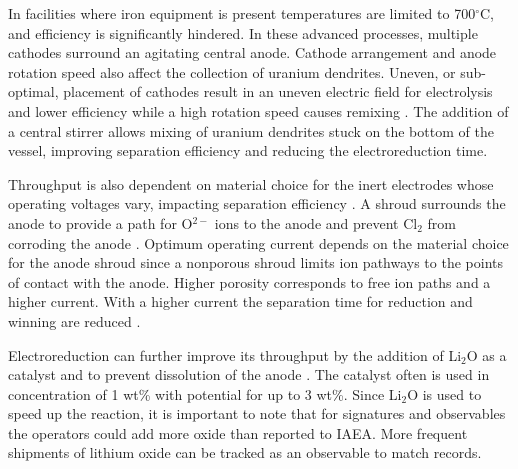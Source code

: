 \documentclass{anstrans}
\begin{document}
In facilities where iron equipment is present temperatures are limited to 700$^{\circ}$C, and efficiency is significantly 
hindered. In these advanced processes, multiple cathodes surround an agitating central anode. Cathode arrangement and anode 
rotation speed also affect the collection of uranium dendrites. Uneven, or sub-optimal, placement of cathodes result in an 
uneven electric field for electrolysis and lower efficiency while a high rotation speed causes remixing \cite{lee_advanced_nodate}. 
The addition of a central stirrer allows mixing of uranium dendrites stuck on the bottom of the vessel, improving separation 
efficiency and reducing the electroreduction time. 

Throughput is also dependent on material choice for the inert electrodes whose operating voltages vary, impacting separation 
efficiency \cite{koyama_development_2012}. A shroud surrounds the anode to provide a path for O$^{2-}$ ions to the anode and 
prevent Cl$_2$ from corroding the anode \cite{kim_development_2013,choi_electrochemical_2015}. Optimum operating current 
depends on the material choice for the anode shroud since a nonporous shroud limits ion pathways to the points of contact 
with the anode. Higher porosity corresponds to free ion paths and a higher current. With a higher current the separation 
time for reduction and winning are reduced \cite{choi_electrochemical_2015}. 


Electroreduction can further improve its throughput by the addition of Li$_2$O as a catalyst and to prevent dissolution 
of the anode \cite{choi_electrochemical_2015}. The catalyst often is used in concentration of 1 wt\% with potential for 
up to 3 wt\%. Since Li$_2$O is used to speed up the reaction, it is important to note that for signatures and observables 
the operators could add more oxide than reported to IAEA. More frequent shipments of lithium oxide can be tracked as an 
observable to match records.
\end{document}
